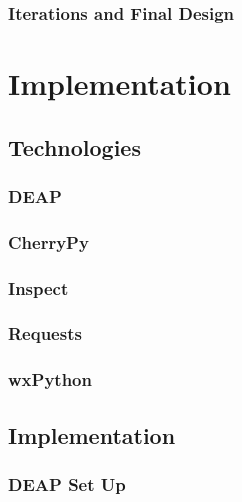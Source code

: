 \documentclass{l4proj}
\begin{document}
\subsection{Iterations and Final Design}

\chapter{Implementation}


\section{Technologies}


\subsection{DEAP}


\subsection{CherryPy}


\subsection{Inspect}


\subsection{Requests}


\subsection{wxPython}


\section{Implementation}


\subsection{DEAP Set Up}

\end{document}
